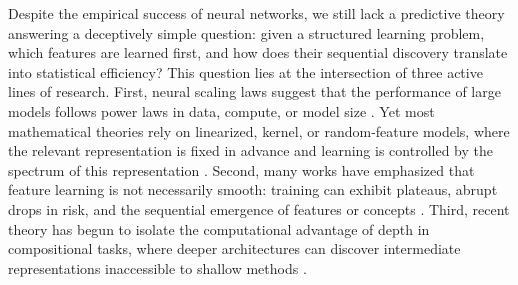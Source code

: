 \documentclass[]{article}
\numberwithin{equation}{section}
\theoremstyle{definition}
\begin{document}
Despite the empirical success of neural networks, we still lack a predictive theory answering a deceptively simple question: given a structured learning problem, which features are learned first, and how does their sequential discovery translate into statistical efficiency? This question lies at the intersection of three active lines of research. First, neural scaling laws suggest that the performance of large models follows power laws in data, compute, or model size \citep{kaplan2020scaling,brown2020language,hoffmann2022empirical,bahri2024explaining}. Yet most mathematical theories rely on linearized, kernel, or random-feature models, where the relevant representation is fixed in advance and learning is controlled by the spectrum of this representation \citep{caponnetto2007optimal,bordelon2020spectrum,spigler2020asymptotic,cui2021generalization,cui2023error,defilippis2024dimension}. Second, many works have emphasized that feature learning is not necessarily smooth: training can exhibit plateaus, abrupt drops in risk, and the sequential emergence of features or concepts \citep{saxe2014exact,wei2022emergent,schaeffer2023emergent,ren2025emergence,defilippis2026optimal}. Third, recent theory has begun to isolate the computational advantage of depth in compositional tasks, where deeper architectures can discover intermediate representations inaccessible to shallow methods \citep{cagnetta2024how,garnierbrun2025transformerslearnstructureddata,dandi2025computational,wang2023learning,nichani2024provable,fu2025learning,tabanelli2026deep}.
\end{document}
